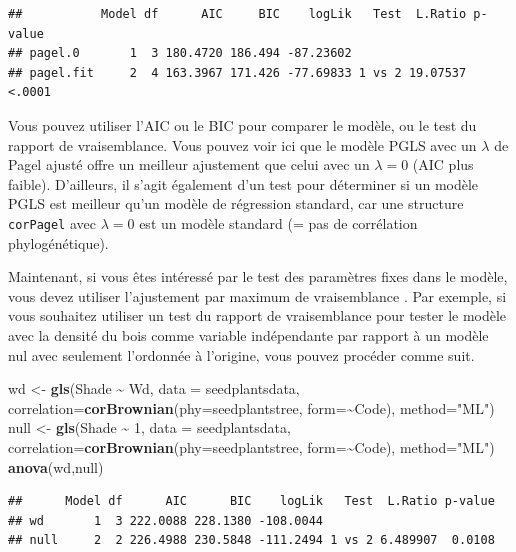 \documentclass[
]{book}
\newenvironment{Shaded}{\begin{snugshade}}{\end{snugshade}}
\newcommand{\AttributeTok}[1]{\textcolor[rgb]{0.13,0.29,0.53}{#1}}
\newcommand{\DecValTok}[1]{\textcolor[rgb]{0.00,0.00,0.81}{#1}}
\newcommand{\FunctionTok}[1]{\textcolor[rgb]{0.13,0.29,0.53}{\textbf{#1}}}
\newcommand{\NormalTok}[1]{#1}
\newcommand{\OtherTok}[1]{\textcolor[rgb]{0.56,0.35,0.01}{#1}}
\newcommand{\SpecialCharTok}[1]{\textcolor[rgb]{0.81,0.36,0.00}{\textbf{#1}}}
\newcommand{\StringTok}[1]{\textcolor[rgb]{0.31,0.60,0.02}{#1}}
\begin{document}
\begin{verbatim}
##           Model df      AIC     BIC    logLik   Test  L.Ratio p-value
## pagel.0       1  3 180.4720 186.494 -87.23602                        
## pagel.fit     2  4 163.3967 171.426 -77.69833 1 vs 2 19.07537  <.0001
\end{verbatim}

Vous pouvez utiliser l'AIC ou le BIC pour comparer le modèle, ou le test du rapport de vraisemblance. Vous pouvez voir ici que le modèle PGLS avec un \(\lambda\) de Pagel ajusté offre un meilleur ajustement que celui avec un \(\lambda=0\) (AIC plus faible). D'ailleurs, il s'agit également d'un test pour déterminer si un modèle PGLS est meilleur qu'un modèle de régression standard, car une structure \texttt{corPagel} avec \(\lambda=0\) est un modèle standard (= pas de corrélation phylogénétique).

Maintenant, si vous êtes intéressé par le test des paramètres fixes dans le modèle, vous devez utiliser l'ajustement par maximum de vraisemblance \citep{zuur2009mixed}. Par exemple, si vous souhaitez utiliser un test du rapport de vraisemblance pour tester le modèle avec la densité du bois comme variable indépendante par rapport à un modèle nul avec seulement l'ordonnée à l'origine, vous pouvez procéder comme suit.

\begin{Shaded}
\begin{Highlighting}[]
\NormalTok{wd }\OtherTok{\textless{}{-}} \FunctionTok{gls}\NormalTok{(Shade }\SpecialCharTok{\textasciitilde{}}\NormalTok{ Wd, }\AttributeTok{data =}\NormalTok{ seedplantsdata,}
          \AttributeTok{correlation=}\FunctionTok{corBrownian}\NormalTok{(}\AttributeTok{phy=}\NormalTok{seedplantstree, }\AttributeTok{form=}\SpecialCharTok{\textasciitilde{}}\NormalTok{Code), }
          \AttributeTok{method=}\StringTok{"ML"}\NormalTok{)}
\NormalTok{null }\OtherTok{\textless{}{-}} \FunctionTok{gls}\NormalTok{(Shade }\SpecialCharTok{\textasciitilde{}} \DecValTok{1}\NormalTok{, }\AttributeTok{data =}\NormalTok{ seedplantsdata,}
            \AttributeTok{correlation=}\FunctionTok{corBrownian}\NormalTok{(}\AttributeTok{phy=}\NormalTok{seedplantstree, }\AttributeTok{form=}\SpecialCharTok{\textasciitilde{}}\NormalTok{Code), }
            \AttributeTok{method=}\StringTok{"ML"}\NormalTok{)}
\FunctionTok{anova}\NormalTok{(wd,null)}
\end{Highlighting}
\end{Shaded}

\begin{verbatim}
##      Model df      AIC      BIC    logLik   Test  L.Ratio p-value
## wd       1  3 222.0088 228.1380 -108.0044                        
## null     2  2 226.4988 230.5848 -111.2494 1 vs 2 6.489907  0.0108
\end{verbatim}
\end{document}
